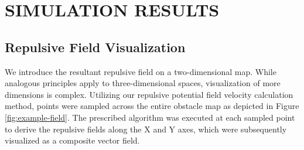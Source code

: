 \documentclass[letterpaper, 10 pt, conference]{ieeeconf}  %
\begin{document}
\section{SIMULATION RESULTS}

\subsection{Repulsive Field Visualization}


We introduce the resultant repulsive field on a two-dimensional map. While analogous principles apply to three-dimensional spaces, visualization of more dimensions is complex. Utilizing our repulsive potential field velocity calculation method, points were sampled across the entire obstacle map as depicted in Figure \ref{fig:example-field}. The prescribed algorithm was executed at each sampled point to derive the repulsive fields along the X and Y axes, which were subsequently visualized as a composite vector field.
\end{document}
